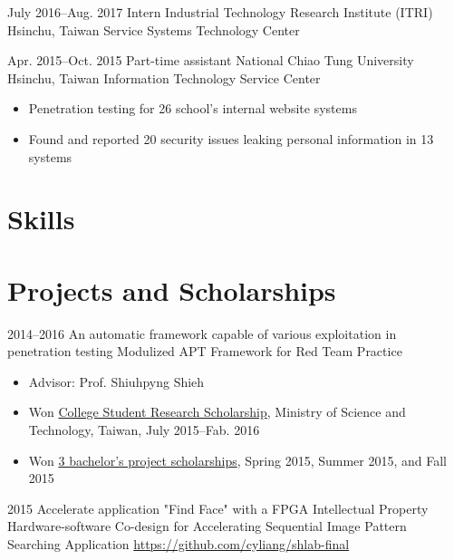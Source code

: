 \documentclass[11pt,a4paper,sans,english]{moderncv}
\begin{document}
    \cventry
        {July 2016--Aug. 2017}
        {Intern}
        {Industrial Technology Research Institute (ITRI)}
        {Hsinchu, Taiwan}
        {Service Systems Technology Center}
        {}
        
    \cventry
        {Apr. 2015--Oct. 2015}
        {Part-time assistant}
        {National Chiao Tung University}
        {Hsinchu, Taiwan}
        {Information Technology Service Center}
        {\begin{itemize}
        \item Penetration testing for 26 school's internal website systems
        \item Found and reported 20 security issues leaking personal information in 13 systems
        \end{itemize}}
        
\section{Skills}
        
\section{Projects and Scholarships}
    \cventry
        {2014--2016} %
        {An automatic framework capable of various exploitation in penetration testing} %
        {Modulized APT Framework for Red Team Practice} %
        {}
        {} %
        {\begin{itemize}
        \item Advisor: Prof. Shiuhpyng Shieh
        \item Won \underline{College Student Research Scholarship}, Ministry of Science and Technology, Taiwan, July 2015--Fab. 2016
        \item Won \underline{3 bachelor's project scholarships}, Spring 2015, Summer 2015, and Fall 2015
        \end{itemize}%
        }
        
    \cventry
        {2015}
        {Accelerate application "Find Face" with a FPGA Intellectual Property}
        {Hardware-software Co-design for Accelerating Sequential Image Pattern Searching Application}
        {}
        {\href{https://github.com/cyliang/shlab-final}{\textnormal{https://github.com/cyliang/shlab-final}}}
        {}
\end{document}
